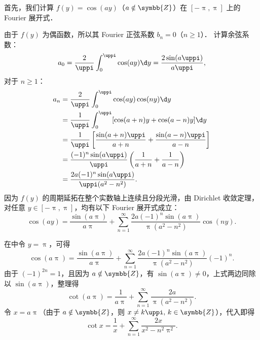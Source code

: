 \begin{myproof}
    首先，我们计算 $f(y) = \cos(ay)$（$a \notin \symbb{Z}$）在 $[-\uppi, \uppi]$ 上的 Fourier 展开式．

    由于 $f(y)$ 为偶函数，所以其 Fourier 正弦系数 $b_n = 0$（$n \geqslant 1$）．
    计算余弦系数：
    \begin{equation}\label{eq:cos-a0}
        a_0 = \frac{2}{\uppi} \int_{0}^{\uppi} \cos(ay) \d y = \frac{2\sin(a\uppi)}{a\uppi},
    \end{equation}
    对于 $n \geqslant 1$：
    \begin{equation}\label{eq:cos-an}
        \begin{aligned}
            a_n & = \frac{2}{\uppi} \int_{0}^{\uppi} \cos(ay) \cos(ny) \d y                                \\
                & = \frac{1}{\uppi} \int_{0}^{\uppi} [ \cos(a+n)y + \cos(a-n)y ] \d y                      \\
                & = \frac{1}{\uppi} \left[ \frac{\sin(a+n)\uppi}{a+n} + \frac{\sin(a-n)\uppi}{a-n} \right] \\
                & = \frac{(-1)^n \sin(a\uppi)}{\uppi} \left( \frac{1}{a+n} + \frac{1}{a-n} \right)         \\
                & = \frac{2a(-1)^n \sin(a\uppi)}{\uppi (a^2 - n^2)}.
        \end{aligned}
    \end{equation}
    因为 $f(y)$ 的周期延拓在整个实数轴上连续且分段光滑，由 Dirichlet 收敛定理，对任意 $y \in [-\uppi, \uppi]$，均有以下 Fourier 展开式成立：
    \begin{equation}\label{eq:cos-expansion}
        \cos(ay) = \frac{\sin(a\uppi)}{a\uppi} + \sum_{n=1}^{\infty} \frac{2a(-1)^n \sin(a\uppi)}{\uppi (a^2 - n^2)} \cos(ny).
    \end{equation}


    在中令 $y = \uppi$，可得
    \begin{equation}\label{eq:cot-sub}
        \cos(a\uppi) = \frac{\sin(a\uppi)}{a\uppi} + \sum_{n=1}^{\infty} \frac{2a(-1)^n \sin(a\uppi)}{\uppi (a^2 - n^2)} (-1)^n.
    \end{equation}
    由于 $(-1)^{2n} = 1$，且因为 $a \notin \symbb{Z}$，有 $\sin(a\uppi) \neq 0$，上式两边同除以 $\sin(a\uppi)$，整理得
    \begin{equation}\label{eq:cot-a}
        \cot(a\uppi) = \frac{1}{a\uppi} + \sum_{n=1}^{\infty} \frac{2a}{\uppi (a^2 - n^2)}.
    \end{equation}
    令 $x = a\uppi$（由于 $a \notin \symbb{Z}$，则 $x \neq k\uppi, \, k \in \symbb{Z}$），代入即得
    \begin{equation}\label{eq:cot-result}
        \cot x = \frac{1}{x} + \sum_{n=1}^{\infty} \frac{2x}{x^2 - n^2 \uppi^2}.
    \end{equation}


\end{myproof}
